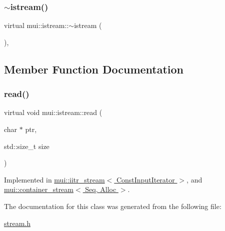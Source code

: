 \subsubsection{\texorpdfstring{$\sim$istream()}{~istream()}}
{\footnotesize\ttfamily virtual mui\+::istream\+::$\sim$istream (\begin{DoxyParamCaption}{ }\end{DoxyParamCaption})\hspace{0.3cm}{\ttfamily [inline]}, {\ttfamily [virtual]}}



\subsection{Member Function Documentation}
\mbox{\label{classmui_1_1istream_a275ecbe530bf67df5978be288897ab45}} 
\subsubsection{\texorpdfstring{read()}{read()}}
{\footnotesize\ttfamily virtual void mui\+::istream\+::read (\begin{DoxyParamCaption}\item[{char $\ast$}]{ptr,  }\item[{std\+::size\+\_\+t}]{size }\end{DoxyParamCaption})\hspace{0.3cm}{\ttfamily [pure virtual]}}



Implemented in \hyperlink{classmui_1_1iitr__stream_aa39fd880d0a4ec821775a86c0d7bc2ce}{mui\+::iitr\+\_\+stream$<$ Const\+Input\+Iterator $>$}, and \hyperlink{classmui_1_1container__stream_a6bcd220029a12f27de5443a2b48b245a}{mui\+::container\+\_\+stream$<$ Seq, Alloc $>$}.



The documentation for this class was generated from the following file\+:\begin{DoxyCompactItemize}
\item 
\hyperlink{stream_8h}{stream.\+h}\end{DoxyCompactItemize}
